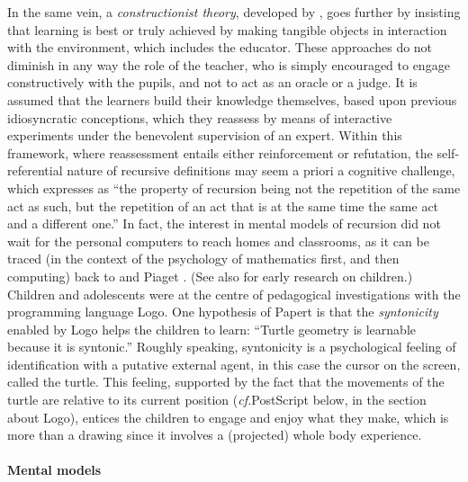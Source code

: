 \documentclass[11pt,a4paper]{article}
\newcommand\plang[1]{\textsf{#1}\xspace}
\begin{document}
In the same vein, a \emph{constructionist theory}, developed by
\textcite{Papert:1980}, goes further by insisting that learning is
best or truly achieved by making tangible objects in interaction with
the environment, which includes the educator. These approaches do not
diminish in any way the role of the teacher, who is simply encouraged
to engage constructively with the pupils, and not to act as an oracle
or a judge. It is assumed that the learners build their knowledge
themselves, based upon previous idiosyncratic conceptions, which they
reassess by means of interactive experiments under the benevolent
supervision of an expert. Within this framework, where reassessment
entails either reinforcement or refutation, the self\hyp{}referential
nature of recursive definitions may seem a priori a cognitive
challenge, which \textcite{Papert:1960b} expresses as ``the property
of recursion being not the repetition of the same act as such, but the
repetition of an act that is at the same time the same act and a
different one.'' In fact, the interest in mental models of recursion
did not wait for the personal computers to reach homes and classrooms,
as it can be traced (in the context of the psychology of mathematics
first, and then computing) back to \textcite{Papert:1960a}
\citeyearpar{Papert:1960b} and Piaget
\citep{InhelderPiaget:1963,PiagetStratz:1974}. (See
\textcite{Matalon:1963,EliotLovellDaytonMcGrady:1979} also for early
research on children.) Children and adolescents were at the centre of
pedagogical investigations with the programming language
\plang{Logo}. One hypothesis of Papert is that the \emph{syntonicity}
enabled by \plang{Logo} helps the children to learn: ``Turtle geometry
is learnable because it is syntonic.\@'' \cite[p.~68]{Papert:1980}
Roughly speaking, syntonicity is a psychological feeling of
identification with a putative external agent, in this case the cursor
on the screen, called the turtle. This feeling, supported by the fact
that the movements of the turtle are relative to its current position
(\emph{cf.}\@ \plang{PostScript} below, in the section about
\plang{Logo}), entices the children to engage and enjoy what they
make, which is more than a drawing since it involves a (projected)
whole body experience.

\paragraph{Mental models}
\end{document}
